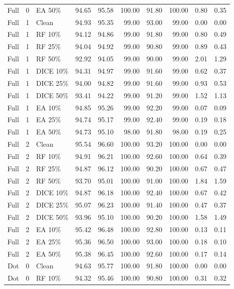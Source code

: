 {\begin{longtable}{rllrrrrrrr}
Full & 0 & EA 50\% & 94.65 & 95.58 & 100.00 & 91.80 & 100.00 & 0.80 & 0.35 \\
Full & 1 & Clean & 94.93 & 95.35 & 99.00 & 93.00 & 99.00 & 0.00 & 0.00 \\
Full & 1 & RF 10\% & 94.12 & 94.86 & 99.00 & 91.80 & 99.00 & 0.80 & 0.49 \\
Full & 1 & RF 25\% & 94.04 & 94.92 & 99.00 & 90.80 & 99.00 & 0.89 & 0.43 \\
Full & 1 & RF 50\% & 92.92 & 94.05 & 99.00 & 90.00 & 99.00 & 2.01 & 1.29 \\
Full & 1 & DICE 10\% & 94.31 & 94.97 & 99.00 & 91.60 & 99.00 & 0.62 & 0.37 \\
Full & 1 & DICE 25\% & 94.00 & 94.82 & 99.00 & 91.60 & 99.00 & 0.93 & 0.53 \\
Full & 1 & DICE 50\% & 93.41 & 94.22 & 99.00 & 91.20 & 99.00 & 1.52 & 1.13 \\
Full & 1 & EA 10\% & 94.85 & 95.26 & 99.00 & 92.20 & 99.00 & 0.07 & 0.09 \\
Full & 1 & EA 25\% & 94.74 & 95.17 & 99.00 & 92.40 & 99.00 & 0.19 & 0.18 \\
Full & 1 & EA 50\% & 94.73 & 95.10 & 98.00 & 91.80 & 98.00 & 0.19 & 0.25 \\
Full & 2 & Clean & 95.54 & 96.60 & 100.00 & 93.20 & 100.00 & 0.00 & 0.00 \\
Full & 2 & RF 10\% & 94.91 & 96.21 & 100.00 & 92.60 & 100.00 & 0.64 & 0.39 \\
Full & 2 & RF 25\% & 94.87 & 96.12 & 100.00 & 90.20 & 100.00 & 0.67 & 0.47 \\
Full & 2 & RF 50\% & 93.70 & 95.01 & 100.00 & 91.00 & 100.00 & 1.84 & 1.59 \\
Full & 2 & DICE 10\% & 94.87 & 96.18 & 100.00 & 92.40 & 100.00 & 0.67 & 0.42 \\
Full & 2 & DICE 25\% & 95.07 & 96.23 & 100.00 & 91.40 & 100.00 & 0.47 & 0.37 \\
Full & 2 & DICE 50\% & 93.96 & 95.10 & 100.00 & 90.20 & 100.00 & 1.58 & 1.49 \\
Full & 2 & EA 10\% & 95.42 & 96.48 & 100.00 & 92.80 & 100.00 & 0.13 & 0.11 \\
Full & 2 & EA 25\% & 95.36 & 96.50 & 100.00 & 93.00 & 100.00 & 0.18 & 0.10 \\
Full & 2 & EA 50\% & 95.38 & 96.45 & 100.00 & 92.60 & 100.00 & 0.17 & 0.14 \\
Dot & 0 & Clean & 94.63 & 95.77 & 100.00 & 91.80 & 100.00 & 0.00 & 0.00 \\
Dot & 0 & RF 10\% & 94.32 & 95.46 & 100.00 & 90.80 & 100.00 & 0.31 & 0.32 \\

\end{longtable}}
